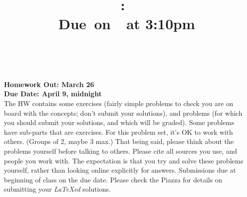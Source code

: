 \documentclass{article}
\title{    \vspace{2in}
    \textmd{\textbf{\hmwkClass:\ \hmwkTitle}}\\
    \normalsize\vspace{0.1in}\small{Due\ on\ \hmwkDueDate\ at 3:10pm}\\
    \vspace{0.1in}\large{\textit{\hmwkClassInstructor\ \hmwkClassTime}}
    \vspace{3in}
}
\author{\hmwkAuthorName}
\date{}
\theoremstyle{plain}
\newcommand{\hmwkAssignedDate}{March 26}
\newcommand{\hmwkDueDate}{April 9, midnight}
\begin{document}

\pagebreak

{\bf Homework Out: \hmwkAssignedDate}\\
{\bf Due Date:  \hmwkDueDate}\\

The HW contains some exercises (fairly simple problems to check you
are on board with the concepts; don’t submit your solutions), and
problems (for which you should submit your solutions, and which will
be graded). Some problems have sub-parts that are exercises.  For this
problem set, it’s OK to work with others. (Groups of 2, maybe 3 max.)
That being said, please think about the problems yourself before
talking to others. Please cite all sources you use, and people you
work with. The expectation is that you try and solve these problems
yourself, rather than looking online explicitly for
answers. Submissions due at beginning of class on the due date.
Please check the Piazza for details on submitting your \emph{LaTeXed}
solutions.

\newcommand{\poly}{\textrm{poly}}
\end{document}
